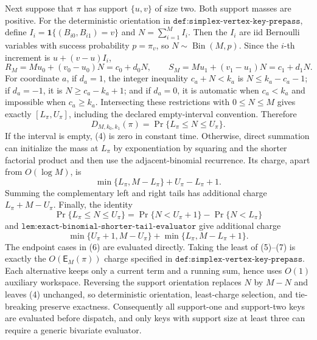 Next suppose that \(\pi\) has support \(\{u,v\}\) of size two. Both support masses are positive. For the deterministic orientation in \(\texttt{def:simplex-vertex-key-prepass}\), define \(I_i=\mathbf 1\{(B_{i0},B_{i1})=v\}\) and \(N=\sum_{i=1}^M I_i\). Then the \(I_i\) are iid Bernoulli variables with success probability \(p=\pi_v\), so \(N\sim\operatorname{Bin}(M,p)\). Since the \(i\)-th increment is \(u+(v-u)I_i\),
\[
R_M=Mu_0+(v_0-u_0)N=c_0+d_0N,\qquad S_M=Mu_1+(v_1-u_1)N=c_1+d_1N.
\tag{3}
\]
For coordinate \(a\), if \(d_a=1\), the integer inequality \(c_a+N<k_a\) is \(N\le k_a-c_a-1\); if \(d_a=-1\), it is \(N\ge c_a-k_a+1\); and if \(d_a=0\), it is automatic when \(c_a<k_a\) and impossible when \(c_a\ge k_a\). Intersecting these restrictions with \(0\le N\le M\) gives exactly \([L_\pi,U_\pi]\), including the declared empty-interval convention. Therefore
\[
D_{M,k_0,k_1}(\pi)=\Pr\{L_\pi\le N\le U_\pi\}.
\tag{4}
\]
If the interval is empty, (4) is zero in constant time. Otherwise, direct summation can initialize the mass at \(L_\pi\) by exponentiation by squaring and the shorter factorial product and then use the adjacent-binomial recurrence. Its charge, apart from \(O(\log M)\), is
\[
\min\{L_\pi,M-L_\pi\}+U_\pi-L_\pi+1.
\tag{5}
\]
Summing the complementary left and right tails has additional charge \(L_\pi+M-U_\pi\). Finally, the identity
\[
\Pr\{L_\pi\le N\le U_\pi\}=\Pr\{N<U_\pi+1\}-\Pr\{N<L_\pi\}
\tag{6}
\]
and \(\texttt{lem:exact-binomial-shorter-tail-evaluator}\) give additional charge
\[
\min\{U_\pi+1,M-U_\pi\}+\min\{L_\pi,M-L_\pi+1\}.
\tag{7}
\]
The endpoint cases in (6) are evaluated directly. Taking the least of (5)--(7) is exactly the \(O(\mathsf E_M(\pi))\) charge specified in \(\texttt{def:simplex-vertex-key-prepass}\). Each alternative keeps only a current term and a running sum, hence uses \(O(1)\) auxiliary workspace. Reversing the support orientation replaces \(N\) by \(M-N\) and leaves (4) unchanged, so deterministic orientation, least-charge selection, and tie-breaking preserve exactness. Consequently all support-one and support-two keys are evaluated before dispatch, and only keys with support size at least three can require a generic bivariate evaluator.